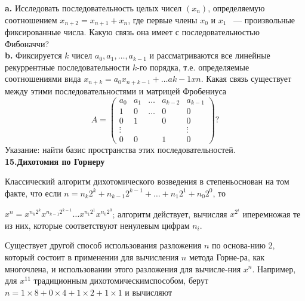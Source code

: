 \hspace*{15pt}\textbf{ a.} Исследовать последовательность целых чисел $\left({x_{n}}\right)$, определяемую соотношением $x_{n+2}=x_{n+1}+x_{n}$, где первые члены $x_{0}$ и $x_{1}$ ~--- произвольные фиксированные числа. Какую связь она имеет с последовательностью Фибоначчи? \newline
\\
\hspace*{15pt}\textbf{ b.} Фиксируется $k$ чисел $a_{0},a_{1},\dots, a_{k-1}$ и рассматриваются все линейные рекуррентные последовательности $k$-го порядка, т.е. определяемые соотношениями вида $x_{n+k}=a_{0}x_{n+k-1}+\dots a{k-1}x{n}$. Какая связь существует между этими последовательностями и матрицей Фробениуса
$$A= \begin{pmatrix} 
a_{0} & a_{1}&\dots    & a_{k-2}& a_{k-1} \\ 
1         & 0        & \dots  & 0           & 0\\
 0        & 1        & {}      & 0           & 0 \\
\vdots & {}      & {}      & {}          & \vdots \\
0         & 0        & {}      & 1           & 0
\end{pmatrix}?$$
Указание: найти базис пространства этих последовательностей.\newline
\\
\noindent\textbf{15.Дихотомия по Горнеру }\ \newline

Классический алгоритм дихотомического возведения в степень\linebreak основан на\: том\: факте, что\: если\: $n=n_{k}2^{k}+ n_{k-1}2^{k-1}+ \dots + n_{1}2^{1}+ n_{0}2^{0}$,\: то
\newpage
	

\noindent $x^{n}=x^{n_{k}2^{k}} x^{n_{k-1}2^{k-1}} \dots x^{n_{1}2^{1}} x^{n_{0}2^{0}}$; алгоритм действует, вычисляя  $x^{2^{i}}$ и\linebreak перемножая те из них, которые соответствуют ненулевым цифрам $n_{i}$. 

Существует другой способ использования разложения $n$ по основа-\linebreak нию 2, который состоит в применении для вычисления $n$ метода Горне-\linebreak ра, как многочлена, и использовании этого разложения для вычисле-\linebreak ния $x^{n}$. Например, для $x^{11}$ традиционным дихотомическим\linebreak способом, берут $ n=1\times{8}+0\times{4}+1\times{2}+1\times{1}$ и вычисляют 

